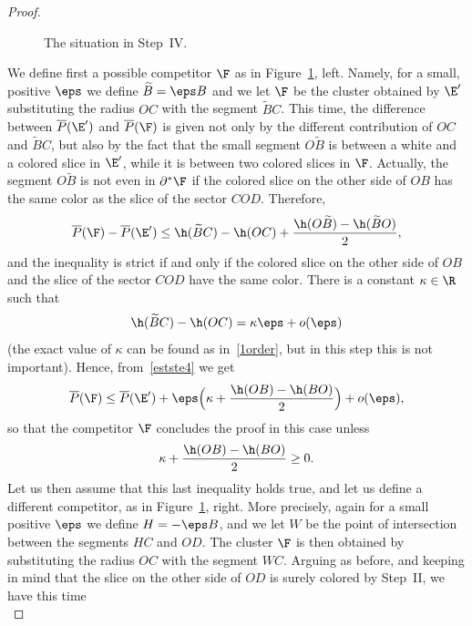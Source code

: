 \begin{proof}
\begin{figure}[htbp]
\caption{The situation in Step~IV.}\label{Figstep4}
\end{figure}
We define first a possible competitor $\F$ as in Figure~\ref{Figstep4}, left. Namely, for a small, positive $\eps$ we define $\widetilde B=\eps B$ and we let $\F$ be the cluster obtained by $\E'$ substituting the radius $OC$ with the segment $\widetilde BC$. This time, the difference between $\overline P(\E')$ and $\overline P(\F)$ is given not only by the different contribution of $OC$ and $\widetilde BC$, but also by the fact that the small segment $O\widetilde B$ is between a white and a colored slice in $\E'$, while it is between two colored slices in $\F$. Actually, the segment $O\widetilde B$ is not even in $\partial^*\F$ if the colored slice on the other side of $OB$ has the same color as the slice of the sector $COD$. Therefore,
\begin{equation}\label{estste4}
\overline P(\F) -\overline P(\E') \leq \h(\widetilde BC)-\h (OC) + \frac{\h(O\widetilde B)-\h(\widetilde B O)}2,
\end{equation}
and the inequality is strict if and only if the colored slice on the other side of $OB$ and the slice of the sector $COD$ have the same color. There is a constant $\kappa\in\R$ such that
\[
\h(\widetilde BC)-\h (OC) = \kappa \eps + o(\eps)
\]
(the exact value of $\kappa$ can be found as in~\eqref{1order}, but in this step this is not important). Hence, from~\eqref{estste4} we get
\[
\overline P(\F) \leq \overline P(\E') + \eps \Bigl(\kappa + \frac{\h(OB)-\h(BO)}2\Bigr) + o(\eps) ,
\]
so that the competitor $\F$ concludes the proof in this case unless
\begin{equation}\label{lastcase}
\kappa + \frac{\h(OB)-\h(BO)}2\geq 0.
\end{equation}
Let us then assume that this last inequality holds true, and let us define a different competitor, as in Figure~\ref{Figstep4}, right. More precisely, again for a small positive $\eps$ we define $H=-\eps B$, and we let $W$ be the point of intersection between the segments $HC$ and $OD$. The cluster $\F$ is then obtained by substituting the radius $OC$ with the segment $WC$. Arguing as before, and keeping in mind that the slice on the other side of $OD$ is surely colored by Step~II, we have this time
\begin{equation}\label{lastcomp}

\end{equation}
\end{proof}
